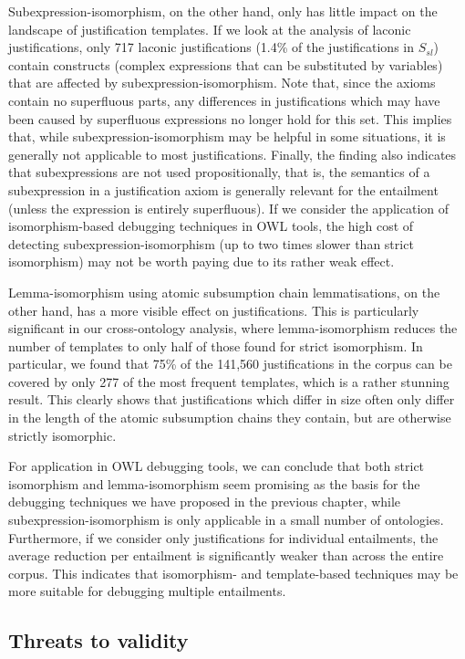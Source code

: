 Subexpression-isomorphism, on the other hand, only has little impact on the landscape of justification templates. If we look at the analysis of laconic justifications, only 717 laconic justifications (1.4\% of the justifications in $S_{sl}$) contain constructs (complex expressions that can be substituted by variables) that are affected by subexpression-isomorphism. Note that,  since the axioms contain no superfluous parts, any differences in justifications which may have been caused by superfluous expressions no longer hold for this set. This implies that, while subexpression-isomorphism may be helpful in some situations, it is generally not applicable to most justifications. Finally, the finding also indicates that subexpressions are not used propositionally, that is, the semantics of a subexpression in a justification axiom is generally relevant for the entailment (unless the expression is entirely superfluous). If we consider the application of isomorphism-based debugging techniques in OWL tools, the high cost of detecting subexpression-isomorphism (up to two times slower than strict isomorphism) may not be worth paying due to its rather weak effect. 

Lemma-isomorphism using atomic subsumption chain lemmatisations, on the other hand, has a more visible effect on justifications. This is particularly significant in our cross-ontology analysis, where lemma-isomorphism reduces the number of templates to only half of those found for strict isomorphism. In particular, we found that 75\% of the 141,560 justifications in the corpus can be covered by only 277 of the most frequent templates, which is a rather stunning result. This clearly shows that justifications which differ in size often only differ in the length of the atomic subsumption chains they contain, but are otherwise strictly isomorphic. 

For application in OWL debugging tools, we can conclude that both strict isomorphism and lemma-isomorphism seem promising as the basis for the debugging techniques we have proposed in the previous chapter, while subexpression-isomorphism is only applicable in a small number of ontologies. Furthermore, if we consider only justifications for individual entailments, the average reduction per entailment is significantly weaker than across the entire corpus. This indicates that isomorphism- and template-based techniques may be more suitable for debugging multiple entailments.


\subsection{Threats to validity}

